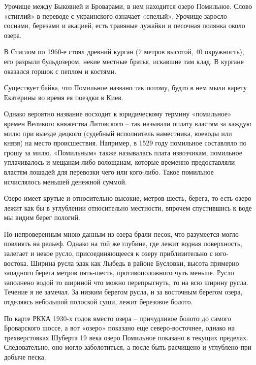 Урочище между Быковней и Броварами, в нем находится озеро Помильное. Слово «стиглий» в переводе с украинского означает «спелый». Урочище заросло соснами, березами и акацией, есть травяные лужайки и песочная полянка около озера.

В Стиглом по 1960-е стоял древний курган (7 метров высотой, 40 окружность), его разрыли бульдозером, некие местные братья, искавшие там клад. В кургане оказался горшок с пеплом и костями.

Существует байка, что Помильное названо так потому, будто в нем мыли карету Екатерины во время ея поездки в Киев.

Однако вероятно название восходит к юридическому термину «помильное» времен Великого княжества Литовского – так называли оплату властям за каждую милю при выезде децкого (судебный исполнитель наместника, воеводы или князя) на место происшествия. Например, в 1529 году помильное составляло по грошу за милю. «Помильным» также называлась плата извозчикам, помильное уплачивалось и мещанам либо волощанам, которые временно предоставляли властям лошадей для перевозки чего или кого-либо. Такое помильное исчислялось меньшей денежной суммой.

Озеро имеет крутые и относительно высокие, метров шесть, берега, то есть озеро лежит как бы в углублении относительно местности, впрочем спустившись к воде мы видим берег пологий.
 
По непроверенным мною данным из озера брали песок, что разумеется могло повлиять на рельеф. Однако на той же глубине, где лежит водная поверхность, залегает и некое русло, присоединяющееся к озеру приблизительно с юго-востока. Ширина русла эдак как Лыбедь в районе Бусловки, высота примерно западного берега метров пять-шесть, противоположного чуть меньше. Русло заполнено водой то шириной что можно перепрыгнуть, то на всю ширину русла. Течение я не замечал. За низким берегом русла, и за восточным берегом озера, отделяясь небольшой полоской суши, лежит березовое болото.

По карте РККА 1930-х годов вместо озера – причудливое болото до самого Броварского шоссе, а вот «озеро» показано еще северо-вос\-точнее, однако на трехверстовках Шуберта 19 века озеро Помильное показано в текущих пределах. Следовательно, оно могло заболотиться, а после быть расчищено и углублено при добыче песка.\\

\medskip


